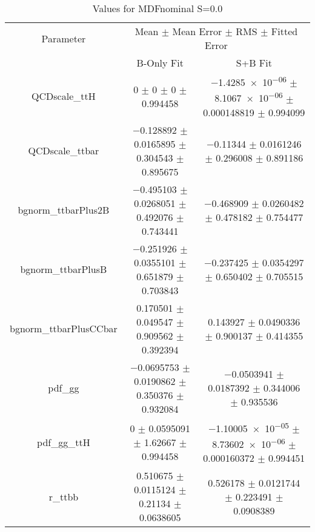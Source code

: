 \begin{table}
\centering
\caption{Values for MDFnominal S=0.0}
\begin{tabular}{ccc}
\toprule
Parameter & \multicolumn{2}{c}{Mean $\pm$ Mean Error $\pm$ RMS $\pm$ Fitted Error}\\
 & B-Only Fit & S+B Fit\\
\midrule
QCDscale\_ttH & \num{0} $\pm$ \num{0} $\pm$ \num{0} $\pm$ \num{0.994458} & \num{-1.4285e-06} $\pm$ \num{8.1067e-06} $\pm$ \num{0.000148819} $\pm$ \num{0.994099}\\
QCDscale\_ttbar & \num{-0.128892} $\pm$ \num{0.0165895} $\pm$ \num{0.304543} $\pm$ \num{0.895675} & \num{-0.11344} $\pm$ \num{0.0161246} $\pm$ \num{0.296008} $\pm$ \num{0.891186}\\
bgnorm\_ttbarPlus2B & \num{-0.495103} $\pm$ \num{0.0268051} $\pm$ \num{0.492076} $\pm$ \num{0.743441} & \num{-0.468909} $\pm$ \num{0.0260482} $\pm$ \num{0.478182} $\pm$ \num{0.754477}\\
bgnorm\_ttbarPlusB & \num{-0.251926} $\pm$ \num{0.0355101} $\pm$ \num{0.651879} $\pm$ \num{0.703843} & \num{-0.237425} $\pm$ \num{0.0354297} $\pm$ \num{0.650402} $\pm$ \num{0.705515}\\
bgnorm\_ttbarPlusCCbar & \num{0.170501} $\pm$ \num{0.049547} $\pm$ \num{0.909562} $\pm$ \num{0.392394} & \num{0.143927} $\pm$ \num{0.0490336} $\pm$ \num{0.900137} $\pm$ \num{0.414355}\\
pdf\_gg & \num{-0.0695753} $\pm$ \num{0.0190862} $\pm$ \num{0.350376} $\pm$ \num{0.932084} & \num{-0.0503941} $\pm$ \num{0.0187392} $\pm$ \num{0.344006} $\pm$ \num{0.935536}\\
pdf\_gg\_ttH & \num{0} $\pm$ \num{0.0595091} $\pm$ \num{1.62667} $\pm$ \num{0.994458} & \num{-1.10005e-05} $\pm$ \num{8.73602e-06} $\pm$ \num{0.000160372} $\pm$ \num{0.994451}\\
r\_ttbb & \num{0.510675} $\pm$ \num{0.0115124} $\pm$ \num{0.21134} $\pm$ \num{0.0638605} & \num{0.526178} $\pm$ \num{0.0121744} $\pm$ \num{0.223491} $\pm$ \num{0.0908389}\\
\bottomrule
\end{tabular}
\end{table}